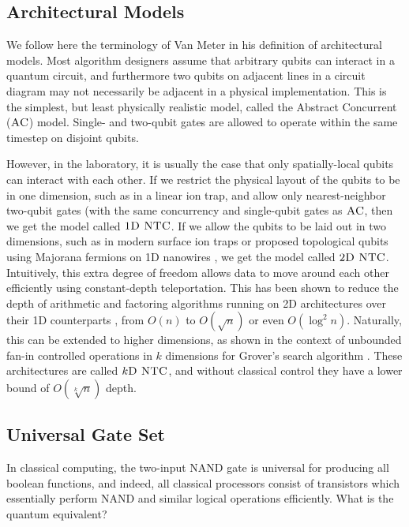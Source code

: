 \subsection{Architectural Models}

We follow here the terminology of Van Meter \cite{VanMeter2006} in his
definition of architectural models. Most algorithm designers assume
that arbitrary qubits can interact in a quantum circuit, and furthermore
two qubits on adjacent lines in a circuit diagram may not necessarily
be adjacent in a physical implementation. This is the simplest, but least
physically realistic model, called the Abstract Concurrent ($\textsc{AC}$) model.
Single- and two-qubit gates are allowed to operate within the same
timestep on disjoint qubits.

However, in the laboratory, it is usually the case that only spatially-local
qubits can interact with each other. If we restrict the physical layout of
the qubits to be in one dimension, such as in a linear ion trap, and
allow only nearest-neighbor two-qubit gates (with the same concurrency and
single-qubit gates as $\textsc{AC}$, then we get the model called
$\textsc{1D NTC}$. If we allow the qubits to be laid out in two dimensions,
such as in modern surface ion traps \cite{Blakestad2011} or
proposed topological qubits using
Majorana fermions on 1D nanowires \cite{Bonderson2010}, we get the
model called $\textsc{2D NTC}$. Intuitively, this extra degree of freedom allows
data to move around each other efficiently using constant-depth teleportation.
This has been shown to reduce the depth of arithmetic and factoring
algorithms running on 2D architectures over
their 1D counterparts \cite{Choi2010} \cite{Pham2012b}, from $O(n)$ to
$O(\sqrt{n})$ or even $O(\log^2 n)$.
Naturally, this can be extended to higher dimensions, as shown in the
context of unbounded fan-in controlled operations in $k$ dimensions for
Grover's search algorithm \cite{Rosenbaum2012}. These architectures are
called $k\textsc{D NTC}$, and without classical control they have a 
lower bound of 
$O(\sqrt[k]{n})$ depth.

\subsection{Universal Gate Set}
\label{subsec:universal}

In classical computing, the two-input NAND gate is universal for producing
all boolean functions, and indeed, all classical processors consist of
transistors which essentially perform NAND and similar logical operations
efficiently. What is the quantum equivalent?

